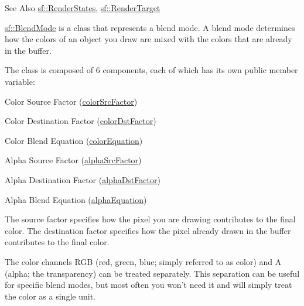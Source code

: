 \begin{DoxySeeAlso}{See Also}
\hyperlink{classsf_1_1_render_states}{sf\-::\-Render\-States}, \hyperlink{classsf_1_1_render_target}{sf\-::\-Render\-Target}
\end{DoxySeeAlso}
\hyperlink{structsf_1_1_blend_mode}{sf\-::\-Blend\-Mode} is a class that represents a blend mode. A blend mode determines how the colors of an object you draw are mixed with the colors that are already in the buffer.

The class is composed of 6 components, each of which has its own public member variable\-: \begin{DoxyItemize}
\item Color Source Factor (\hyperlink{structsf_1_1_blend_mode_a32d1a55dbfada86a06d9b881dc8ccf7b}{color\-Src\-Factor}) \item Color Destination Factor (\hyperlink{structsf_1_1_blend_mode_adee68ee59e7f1bf71d12db03d251104d}{color\-Dst\-Factor}) \item Color Blend Equation (\hyperlink{structsf_1_1_blend_mode_aed12f06eb7f50a1b95b892b0964857b1}{color\-Equation}) \item Alpha Source Factor (\hyperlink{structsf_1_1_blend_mode_aa94e44f8e1042a7357e8eff78c61a1be}{alpha\-Src\-Factor}) \item Alpha Destination Factor (\hyperlink{structsf_1_1_blend_mode_aaf85b6b7943181cc81745569c4851e4e}{alpha\-Dst\-Factor}) \item Alpha Blend Equation (\hyperlink{structsf_1_1_blend_mode_a68f5a305e0912946f39ba6c9265710c4}{alpha\-Equation})\end{DoxyItemize}
The source factor specifies how the pixel you are drawing contributes to the final color. The destination factor specifies how the pixel already drawn in the buffer contributes to the final color.

The color channels R\-G\-B (red, green, blue; simply referred to as color) and A (alpha; the transparency) can be treated separately. This separation can be useful for specific blend modes, but most often you won't need it and will simply treat the color as a single unit.

